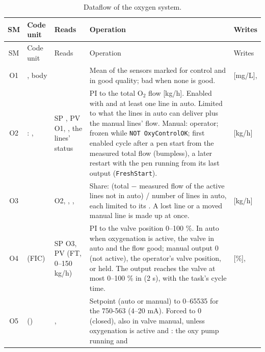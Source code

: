 \documentclass[11pt]{article}
\newcommand{\code}[1]{\texttt{#1}}
\begin{document}
\begin{landscape}
\small
\begin{longtable}{@{}cP{33mm}P{50mm}P{82mm}P{48mm}@{}}
\caption{Dataflow of the oxygen system.}\label{tab:oxyflow}\\
\toprule
SM & Code unit & Reads & Operation & Writes \\
\midrule
\endfirsthead
\toprule
SM & Code unit & Reads & Operation & Writes \\
\midrule
\endhead
\bottomrule
\endfoot
O1 & , body &
   &
  Mean of the sensors marked for control and in good quality; bad when none is good. &
   [mg/L],  \\
O2 & : ,  &
  SP , PV O1, , the lines' status &
  PI to the total O$_2$ flow [kg/h]. Enabled with  and at least one line in auto.
  Limited to what the lines in auto can deliver plus the manual lines' flow. Manual: operator;
  frozen while \code{NOT OxyControlOK}; first enabled cycle after a pen start from the measured total
  flow (bumpless), a later restart with the pen running from its last output (\code{FreshStart}). &
   [kg/h] \\
O3 &  &
  O2, , ,  &
  Share: (total $-$ measured flow of the active lines not in auto) / number of lines in auto,
  each limited to its . A lost line or a moved manual line is made up at once. &
   [kg/h] \\
O4 &  (FIC) &
  SP O3, PV  (FT, 0--150 kg/h) &
  PI to the valve position 0--100 \%. In auto when oxygenation is active, the valve in auto and
  the flow good; manual output 0 (not active), the operator's valve position, or held. The output
  reaches the valve at most 0--100 \% in  (2 s), with the task's
  cycle time. &
   [\%],  \\
O5 &  () &
  ,  &
  Setpoint (auto or manual) to 0--65535 for the 750-563 (4--20 mA). Forced to 0 (closed), also in
  valve manual, unless oxygenation is active and : the oxy pump running and

\end{longtable}
\end{landscape}
\end{document}
